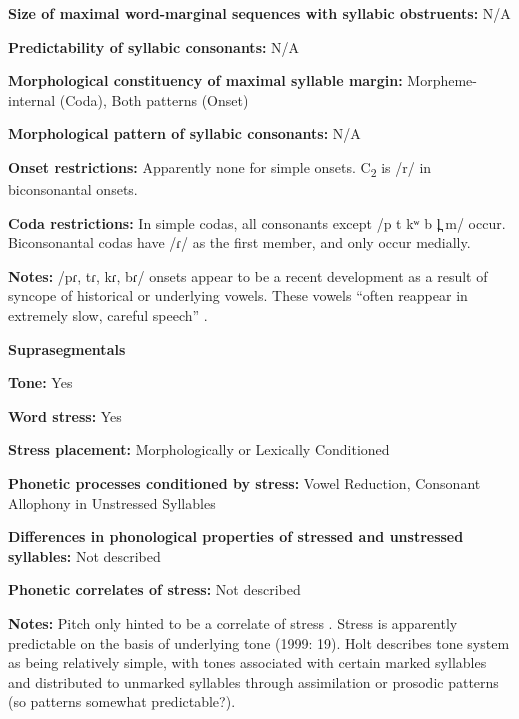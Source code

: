 \textbf{Size of maximal word{}-marginal sequences with syllabic obstruents:} N/A



\textbf{Predictability of syllabic consonants:} N/A



\textbf{Morphological constituency of maximal syllable margin:} Morpheme-internal (Coda), Both patterns (Onset)



\textbf{Morphological pattern of syllabic consonants:} N/A



\textbf{Onset restrictions:} Apparently none for simple onsets. C\textsubscript{2} is /r/ in biconsonantal onsets.



\textbf{Coda restrictions:} In simple codas, all consonants except /p t kʷ b l̪ m/ occur. Biconsonantal codas have /ɾ/ as the first member, and only occur medially.



\textbf{Notes:} /pɾ, tɾ, kɾ, bɾ/ onsets appear to be a recent development as a result of syncope of historical or underlying vowels. These vowels “often reappear in extremely slow, careful speech” \citep[20]{Holt1999}.



\textbf{Suprasegmentals}



\textbf{Tone:} Yes



\textbf{Word stress:} Yes



\textbf{Stress placement:} Morphologically or Lexically Conditioned



\textbf{Phonetic processes conditioned by stress:} Vowel Reduction, Consonant Allophony in Unstressed Syllables



\textbf{Differences in phonological properties of stressed and unstressed syllables:} Not described



\textbf{Phonetic correlates of stress:} Not described



\textbf{Notes:} Pitch only hinted to be a correlate of stress \citep[238]{Holt1986}. Stress is apparently predictable on the basis of underlying tone (1999: 19). Holt describes tone system as being relatively simple, with tones associated with certain marked syllables and distributed to unmarked syllables through assimilation or prosodic patterns (so patterns somewhat predictable?).



